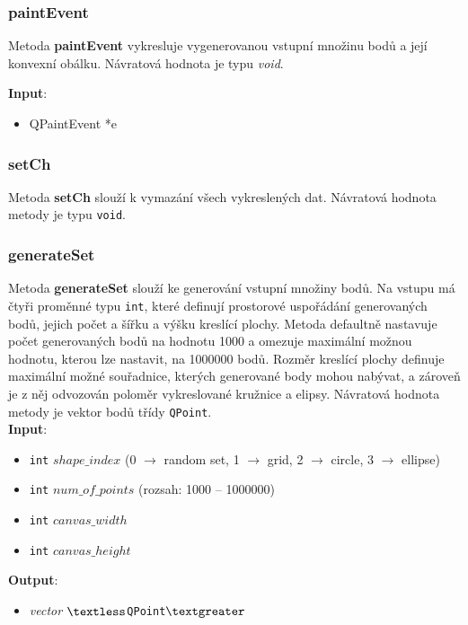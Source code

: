 \documentclass[a4paper, 12pt]{article}
\begin{document}
\subsubsection*{paintEvent}
Metoda \textbf{paintEvent} vykresluje vygenerovanou vstupní množinu bodů a její konvexní obálku. Návratová hodnota je typu \textit{void}.

\textbf{Input}:
\begin{itemize}
\item QPaintEvent *e
\end{itemize}

\subsubsection*{setCh}
Metoda \textbf{setCh} slouží k vymazání všech vykreslených dat. Návratová hodnota metody je typu \texttt{void}.

\subsubsection*{generateSet}
Metoda \textbf{generateSet} slouží ke generování vstupní množiny bodů. Na vstupu má čtyři proměnné typu \texttt{int}, které definují prostorové uspořádání generovaných bodů, jejich počet a šířku a výšku kreslící plochy. Metoda defaultně nastavuje počet generovaných bodů na hodnotu 1000 a omezuje maximální možnou hodnotu, kterou lze nastavit, na 1000000 bodů. Rozměr kreslící plochy definuje maximální možné souřadnice, kterých generované body mohou nabývat, a zároveň je z něj odvozován poloměr vykreslované kružnice a elipsy. Návratová hodnota metody je vektor bodů třídy \texttt{QPoint}.\\

\textbf{Input}:
\begin{itemize}
\item \texttt{int} $shape\_index$ (0 $\rightarrow$ random set, 1 $\rightarrow$ grid, 2 $\rightarrow$ circle, 3 $\rightarrow$ ellipse)
\item \texttt{int} $num\_of\_points$ (rozsah: 1000 – 1000000)
\item \texttt{int} $canvas\_width$
\item \texttt{int} $canvas\_height$
\end{itemize}

\textbf{Output}:
\begin{itemize}
\item \textsl{vector} $\textless$\texttt{QPoint}$\textgreater$
\end{itemize}
\end{document}
